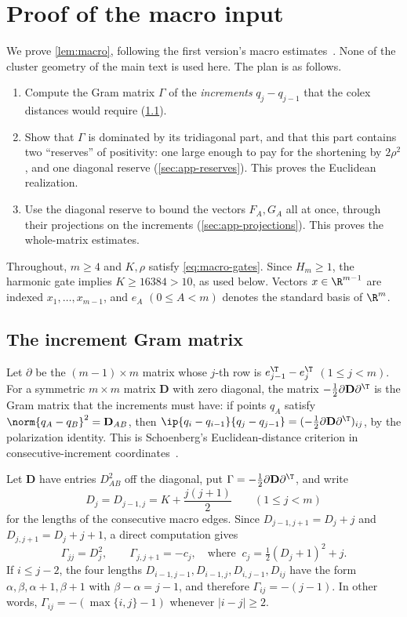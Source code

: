 \section{Proof of the macro input}\label{app:macro}

We prove \cref{lem:macro}, following the first version's macro
estimates~\cite[Lemmas~2--3]{Tripodo}. None of the cluster geometry of
the main text is used here. The plan is as follows.
\begin{enumerate}[leftmargin=2em,itemsep=1pt]
\item Compute the Gram matrix $\Gamma$ of the \emph{increments}
 $q_j-q_{j-1}$ that the colex distances would require
 (\cref{sec:app-gram}).
\item Show that $\Gamma$ is dominated by its tridiagonal part, and that
 this part contains two ``reserves'' of positivity: one large
 enough to pay for the shortening by $2\rho^2$, and one diagonal reserve
 (\cref{sec:app-reserves}). This proves the Euclidean realization.
\item Use the diagonal reserve to bound the vectors $F_A,G_A$ all at once,
 through their projections on the increments (\cref{sec:app-projections}).
 This proves the whole-matrix estimates.
\end{enumerate}
Throughout, $m\ge4$ and $K,\rho$ satisfy \eqref{eq:macro-gates}. Since
$H_m\ge1$, the harmonic gate implies $K\ge16384>10$, as used below. Vectors
$x\in\R^{m-1}$ are indexed $x_1,\dots,x_{m-1}$, and $e_A$ $(0\le A<m)$
denotes the standard basis of $\R^m$.

\subsection{The increment Gram matrix}\label{sec:app-gram}

Let $\partial$ be the $(m-1)\times m$ matrix whose $j$-th row is
$e_{j-1}^\T-e_j^\T$ $(1\le j<m)$. For a symmetric $m\times m$ matrix
$\mathbf D$ with zero diagonal, the matrix $-\frac12\partial\mathbf
D\partial^\T$ is the Gram matrix that the increments must have: if points
$q_A$ satisfy $\norm{q_A-q_B}^2=\mathbf D_{AB}$, then
$\ip{q_i-q_{i-1}}{q_j-q_{j-1}}=(-\frac12\partial\mathbf D\partial^\T)_{ij}$,
by the polarization identity. This is Schoenberg's Euclidean-distance
criterion in consecutive-increment coordinates~\cite[Theorem~1]{Schoenberg}.

Let $\mathbf D$ have entries $D_{AB}^2$ off the diagonal, put
$\Gamma=-\frac12\partial\mathbf D\partial^\T$, and write
\[
 D_j=D_{j-1,j}=K+\frac{j(j+1)}2\qquad(1\le j<m)
\]
for the lengths of the consecutive macro edges. Since
$D_{j-1,j+1}=D_j+j$ and $D_{j,j+1}=D_j+j+1$, a direct computation gives
\begin{equation}\label{eq:gram-entries}
 \Gamma_{jj}=D_j^2,\qquad
 \Gamma_{j,j+1}=-c_j,\quad\text{where }\ c_j=\tfrac12(D_j+1)^2+j.
\end{equation}
If $i\le j-2$, the four lengths $D_{i-1,j-1},D_{i-1,j},D_{i,j-1},D_{ij}$ have
the form $\alpha,\beta,\alpha+1,\beta+1$ with $\beta-\alpha=j-1$, and
therefore $\Gamma_{ij}=-(j-1)$. In other words, $\Gamma_{ij}=-(\max\{i,j\}-1)$
whenever $|i-j|\ge2$.

